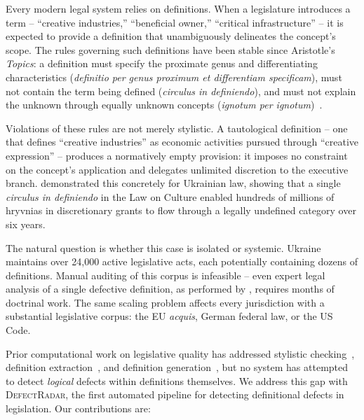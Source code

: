 \documentclass[11pt]{article}
\begin{document}
Every modern legal system relies on definitions.
When a legislature introduces a term -- ``creative industries,'' ``beneficial owner,'' ``critical infrastructure'' -- it is expected to provide a definition that unambiguously delineates the concept's scope.
The rules governing such definitions have been stable since Aristotle's \emph{Topics}: a definition must specify the proximate genus and differentiating characteristics (\emph{definitio per genus proximum et differentiam specificam}), must not contain the term being defined (\emph{circulus in definiendo}), and must not explain the unknown through equally unknown concepts (\emph{ignotum per ignotum})~\citep{hart2012concept,dzeiko2007legislative}.

Violations of these rules are not merely stylistic.
A tautological definition -- one that defines ``creative industries'' as economic activities pursued through ``creative expression'' -- produces a normatively empty provision: it imposes no constraint on the concept's application and delegates unlimited discretion to the executive branch.
\citet{kyrychenko2026creative} demonstrated this concretely for Ukrainian law, showing that a single \emph{circulus in definiendo} in the Law on Culture enabled hundreds of millions of hryvnias in discretionary grants to flow through a legally undefined category over six years.

The natural question is whether this case is isolated or systemic.
Ukraine maintains over 24{,}000 active legislative acts, each potentially containing dozens of definitions.
Manual auditing of this corpus is infeasible -- even expert legal analysis of a single defective definition, as performed by \citet{kyrychenko2026creative}, requires months of doctrinal work.
The same scaling problem affects every jurisdiction with a substantial legislative corpus: the EU \emph{acquis}, German federal law, or the US Code.

Prior computational work on legislative quality has addressed stylistic checking~\citep{hofler2012style}, definition extraction~\citep{hosabettu2025statutory}, and definition generation~\citep{chouhan2024lexdrafter}, but no system has attempted to detect \emph{logical} defects within definitions themselves.
We address this gap with \textsc{DefectRadar}, the first automated pipeline for detecting definitional defects in legislation.
Our contributions are:
\end{document}
